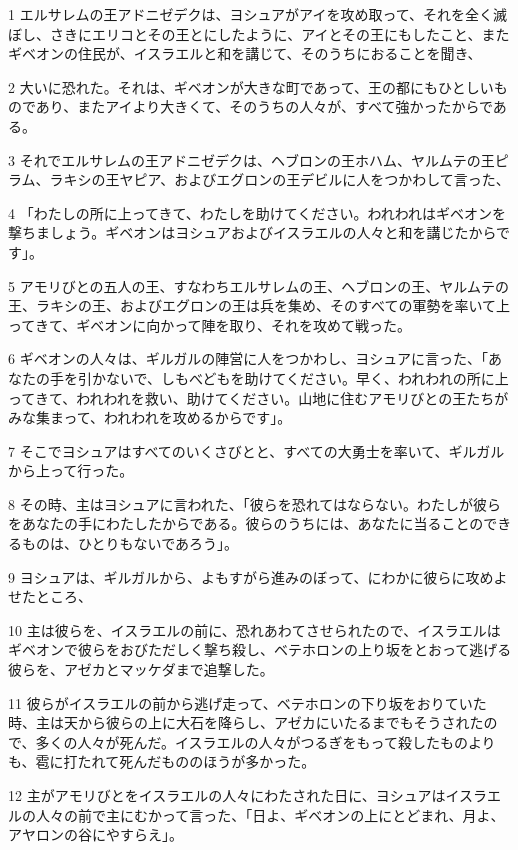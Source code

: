 \par 1 エルサレムの王アドニゼデクは、ヨシュアがアイを攻め取って、それを全く滅ぼし、さきにエリコとその王とにしたように、アイとその王にもしたこと、またギベオンの住民が、イスラエルと和を講じて、そのうちにおることを聞き、
\par 2 大いに恐れた。それは、ギベオンが大きな町であって、王の都にもひとしいものであり、またアイより大きくて、そのうちの人々が、すべて強かったからである。
\par 3 それでエルサレムの王アドニゼデクは、ヘブロンの王ホハム、ヤルムテの王ピラム、ラキシの王ヤピア、およびエグロンの王デビルに人をつかわして言った、
\par 4 「わたしの所に上ってきて、わたしを助けてください。われわれはギベオンを撃ちましょう。ギベオンはヨシュアおよびイスラエルの人々と和を講じたからです」。
\par 5 アモリびとの五人の王、すなわちエルサレムの王、ヘブロンの王、ヤルムテの王、ラキシの王、およびエグロンの王は兵を集め、そのすべての軍勢を率いて上ってきて、ギベオンに向かって陣を取り、それを攻めて戦った。
\par 6 ギベオンの人々は、ギルガルの陣営に人をつかわし、ヨシュアに言った、「あなたの手を引かないで、しもべどもを助けてください。早く、われわれの所に上ってきて、われわれを救い、助けてください。山地に住むアモリびとの王たちがみな集まって、われわれを攻めるからです」。
\par 7 そこでヨシュアはすべてのいくさびとと、すべての大勇士を率いて、ギルガルから上って行った。
\par 8 その時、主はヨシュアに言われた、「彼らを恐れてはならない。わたしが彼らをあなたの手にわたしたからである。彼らのうちには、あなたに当ることのできるものは、ひとりもないであろう」。
\par 9 ヨシュアは、ギルガルから、よもすがら進みのぼって、にわかに彼らに攻めよせたところ、
\par 10 主は彼らを、イスラエルの前に、恐れあわてさせられたので、イスラエルはギベオンで彼らをおびただしく撃ち殺し、ベテホロンの上り坂をとおって逃げる彼らを、アゼカとマッケダまで追撃した。
\par 11 彼らがイスラエルの前から逃げ走って、ベテホロンの下り坂をおりていた時、主は天から彼らの上に大石を降らし、アゼカにいたるまでもそうされたので、多くの人々が死んだ。イスラエルの人々がつるぎをもって殺したものよりも、雹に打たれて死んだもののほうが多かった。
\par 12 主がアモリびとをイスラエルの人々にわたされた日に、ヨシュアはイスラエルの人々の前で主にむかって言った、「日よ、ギベオンの上にとどまれ、月よ、アヤロンの谷にやすらえ」。
